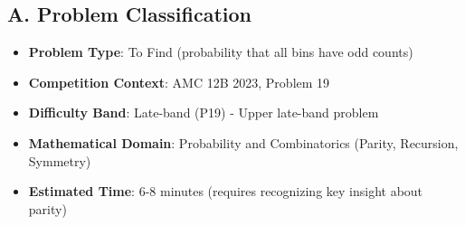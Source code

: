 \documentclass[12pt]{article}
\begin{document}
\begin{problemconfigbox}
\subsection*{A. Problem Classification}
\begin{itemize}[leftmargin=*]
    \item \textbf{Problem Type}: To Find (probability that all bins have odd counts)
    \item \textbf{Competition Context}: AMC 12B 2023, Problem 19
    \item \textbf{Difficulty Band}: Late-band (P19) - Upper late-band problem
    \item \textbf{Mathematical Domain}: Probability and Combinatorics (Parity, Recursion, Symmetry)
    \item \textbf{Estimated Time}: 6-8 minutes (requires recognizing key insight about parity)
\end{itemize}


\end{problemconfigbox}
\end{document}
